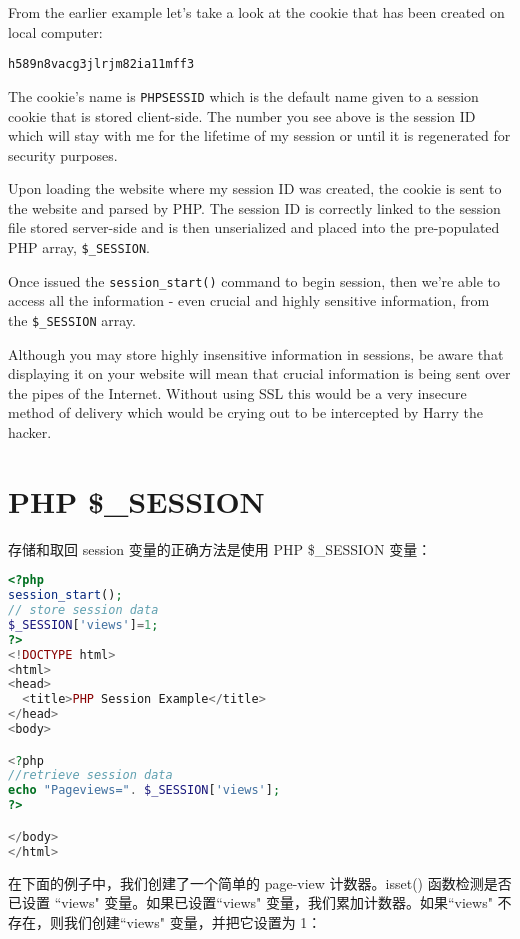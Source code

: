From the earlier example let's take a look at the cookie that has been created on local computer:

\verb|h589n8vacg3jlrjm82ia11mff3|

The cookie's name is \texttt{PHPSESSID} which is the default name given to a session cookie that is stored client-side. The number you see above is the session ID which will stay with me for the lifetime of my session or until it is regenerated for security purposes.

Upon loading the website where my session ID was created, the cookie is sent to the website and parsed by PHP. The session ID is correctly linked to the session file stored server-side and is then unserialized and placed into the pre-populated PHP array, \texttt{\$\_SESSION}. 

Once issued the \texttt{session\_start()} command to begin session, then we're able to access all the information - even crucial and highly sensitive information, from the \texttt{\$\_SESSION} array.


Although you may store highly insensitive information in sessions, be aware that displaying it on your website will mean that crucial information is being sent over the pipes of the Internet. Without using SSL this would be a very insecure method of delivery which would be crying out to be intercepted by Harry the hacker.




\section{PHP \$\_SESSION}


存储和取回 session 变量的正确方法是使用 PHP \$\_SESSION 变量：


\begin{lstlisting}[language=PHP]
<?php
session_start();
// store session data
$_SESSION['views']=1;
?>
<!DOCTYPE html>
<html>
<head>
  <title>PHP Session Example</title>
</head>
<body>

<?php
//retrieve session data
echo "Pageviews=". $_SESSION['views'];
?>

</body>
</html>
\end{lstlisting}



在下面的例子中，我们创建了一个简单的 page-view 计数器。isset() 函数检测是否已设置 ``views" 变量。如果已设置``views" 变量，我们累加计数器。如果``views" 不存在，则我们创建``views" 变量，并把它设置为 1：

